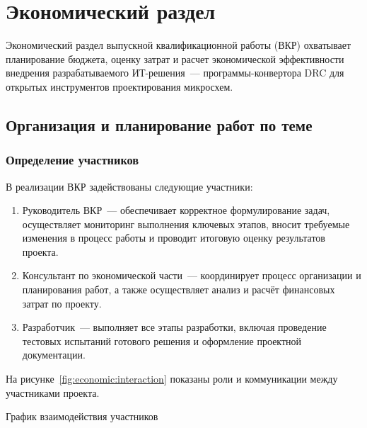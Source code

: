 \chapter{Экономический раздел}

Экономический раздел
выпускной квалификационной работы (ВКР)
охватывает планирование бюджета, оценку затрат
и расчет экономической эффективности внедрения разрабатываемого
ИТ-решения~--- программы-конвертора DRC
для открытых инструментов проектирования микросхем.

\section{Организация и планирование работ по теме}

\subsection{Определение участников}

В реализации ВКР задействованы следующие участники:

\begin{enumerate}
	\item Руководитель ВКР~---
		обеспечивает корректное формулирование задач,
		осуществляет мониторинг выполнения ключевых этапов,
		вносит требуемые изменения в процесс работы
		и проводит итоговую оценку результатов проекта.
	\item Консультант по экономической части~---
		координирует процесс организации и планирования работ,
		а также осуществляет анализ и расчёт финансовых затрат по проекту.
	\item Разработчик~---
		выполняет все этапы разработки,
		включая проведение тестовых испытаний готового решения
		и оформление проектной документации.
\end{enumerate}

На рисунке~\ref{fig:economic:interaction} показаны роли
и коммуникации между участниками проекта.

\begin{image}
	\caption{График взаимодействия участников}
	\label{fig:economic:interaction}
\end{image}

